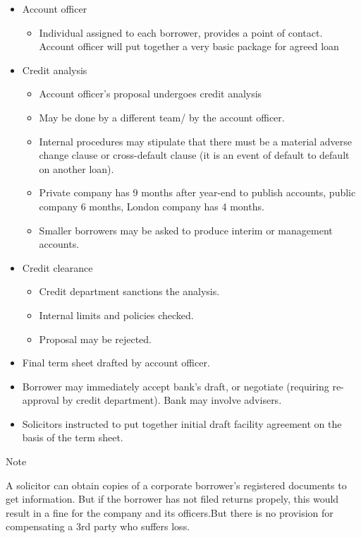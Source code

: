 \documentclass[
]{article}
\providecommand{\tightlist}{%
  \setlength{\itemsep}{0pt}\setlength{\parskip}{0pt}}
\newenvironment{env-b81a0bad-19ae-4a38-aa54-7c89ad4aa09e}
{
    \savenotes\tcolorbox[blanker,breakable,left=5pt,borderline west={2pt}{-4pt}{blue}]
}
{
    \endtcolorbox\spewnotes
}
\begin{document}
\begin{itemize}
\tightlist
\item
  Account officer

  \begin{itemize}
  \tightlist
  \item
    Individual assigned to each borrower, provides a point of contact.
    Account officer will put together a very basic package for agreed
    loan
  \end{itemize}
\item
  Credit analysis

  \begin{itemize}
  \tightlist
  \item
    Account officer's proposal undergoes credit analysis
  \item
    May be done by a different team/ by the account officer.
  \item
    Internal procedures may stipulate that there must be a material
    adverse change clause or cross-default clause (it is an event of
    default to default on another loan).
  \item
    Private company has 9 months after year-end to publish accounts,
    public company 6 months, London company has 4 months.
  \item
    Smaller borrowers may be asked to produce interim or management
    accounts.
  \end{itemize}
\item
  Credit clearance

  \begin{itemize}
  \tightlist
  \item
    Credit department sanctions the analysis.
  \item
    Internal limits and policies checked.
  \item
    Proposal may be rejected.
  \end{itemize}
\item
  Final term sheet drafted by account officer.
\item
  Borrower may immediately accept bank's draft, or negotiate (requiring
  re-approval by credit department). Bank may involve advisers.
\item
  Solicitors instructed to put together initial draft facility agreement
  on the basis of the term sheet.
\end{itemize}

\begin{env-b81a0bad-19ae-4a38-aa54-7c89ad4aa09e}

Note

A solicitor can obtain copies of a corporate borrower's registered
documents to get information. But if the borrower has not filed returns
propely, this would result in a fine for the company and its
officers.But there is no provision for compensating a 3rd party who
suffers loss.

\end{env-b81a0bad-19ae-4a38-aa54-7c89ad4aa09e}
\end{document}
